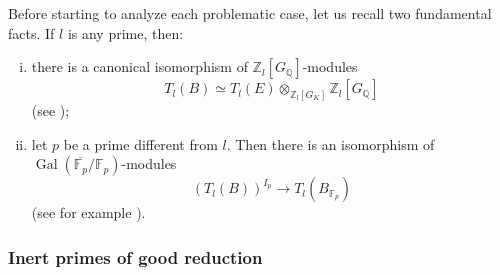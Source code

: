 \documentclass[11pt]{amsart}
\theoremstyle{definition}
\begin{document}
		Before starting to analyze each problematic case, let us recall two fundamental facts. If $l$ is any prime, then:
		\begin{enumerate}[i)] 
			\item there is a canonical isomorphism of ${\mathbb{Z}}_l[{G_{\mathbb{Q}}}]$-modules
				\begin{equation} \label{indrep}
					T_l(B)\simeq T_l(E)\otimes_{{\mathbb{Z}}_l[G_K]}{\mathbb{Z}}_l[{G_{\mathbb{Q}}}]
			\end{equation}
			(see \cite{mil1});
			\item let $p$ be a prime different from $l$. Then there is an isomorphism of $\operatorname{Gal}(\overline{{\mathbb{F}}_p}/{\mathbb{F}}_p)$-modules
				\begin{equation}\label{inertia-invariants}
				(T_l(B))^{I_p}\to T_l(B_{{\mathbb{F}}_p})
			\end{equation}
			(see for example \cite{serta}).
		\end{enumerate}

\subsubsection*{Inert primes of good reduction}
\end{document}
